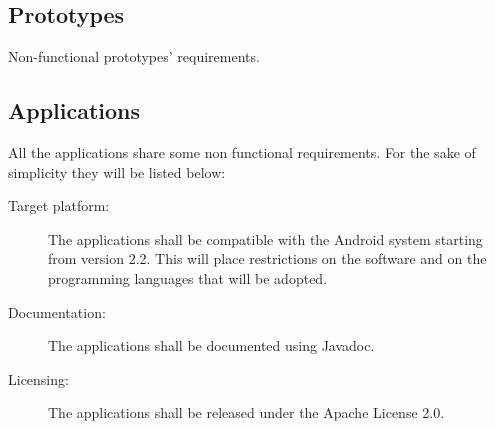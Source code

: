 \subsection{Prototypes}

Non-functional prototypes' requirements.

\subsection{Applications}

All the applications share some non functional requirements.
For the sake of simplicity they will be listed below:

\begin{description}
	\item[Target platform:] The applications shall be compatible with the
	Android system starting from version 2.2. This will place restrictions on
	the software and on the programming languages that will be adopted.
	\item[Documentation:] The applications shall be documented using Javadoc.
	\item[Licensing:] The applications shall be released under the Apache
	License 2.0.
\end{description}